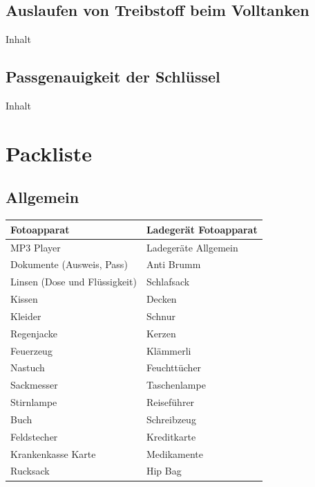 \subsection{Auslaufen von Treibstoff beim Volltanken}
Inhalt

\subsection{Passgenauigkeit der Schlüssel}
Inhalt
\newpage
\section{Packliste}
\subsection{Allgemein}
\begin{center}
\begin{tabular}{|p{5cm}|p{5cm}|}\hline
Fotoapparat & Ladegerät Fotoapparat \\ \hline
MP3 Player & Ladegeräte Allgemein \\ \hline
Dokumente (Ausweis, Pass) & Anti Brumm \\ \hline
Linsen (Dose und Flüssigkeit) & Schlafsack \\ \hline
Kissen & Decken \\ \hline
Kleider & Schnur \\ \hline
Regenjacke & Kerzen \\ \hline
Feuerzeug & Klämmerli \\ \hline
Nastuch & Feuchttücher \\ \hline
Sackmesser & Taschenlampe \\ \hline
Stirnlampe & Reiseführer \\ \hline
Buch & Schreibzeug \\ \hline
Feldstecher & Kreditkarte \\ \hline
Krankenkasse Karte & Medikamente \\ \hline
Rucksack & Hip Bag \\ \hline
\end{tabular}
\end{center}
\newpage
 
